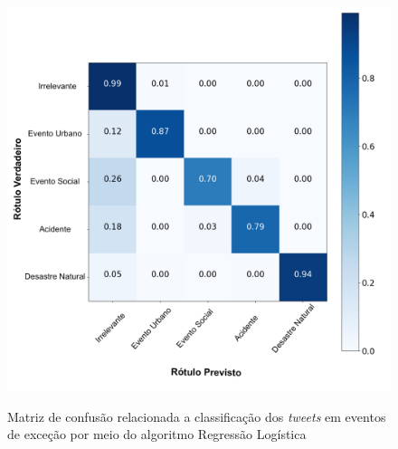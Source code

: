 \documentclass[
	12pt,				%
	oneside,			%
	a4paper,			%
	english,			%
	brazil				%
	]{abntex2ppgsi}
\begin{document}
{{{\begin{apendicesenv}
\begin{figure}[!htb]
	\centering
 	  \caption{Matriz de confusão relacionada a classificação dos \textit{tweets} em eventos de exceção por meio do algoritmo Regressão Logística}
		\includegraphics[width=1\linewidth]{images/confusion_matrix_lr_pt.png}
	\label{fig:confusion_matrix_rl}
\end{figure}


\end{apendicesenv}}}}
\end{document}
